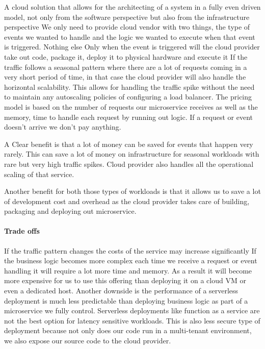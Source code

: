 \documentclass[a4paper, 11pt]{book}
\begin{document}
    A cloud solution that allows for the architecting of a system in a fully even driven model, not only from the software perspective but also from the infrastructure perspective
    We only need to provide cloud vendor with two things, the type of events we wanted to handle and the logic we wanted to execute when that event is triggered.
    Nothing else
    Only when the event is triggered will the cloud provider take out code, package it, deploy it to physical hardware and execute it
    If the traffic follows a seasonal pattern where there are a lot of requests coming in a very short period of time, in that case the cloud provider will also handle the horizontal scalability.
    This allows for handling the traffic spike without the need to maintain any autoscaling policies of configuring a load balancer.
    The pricing model is based on the number of requests our microservice receives as well as the memory, time to handle each request by running out logic.
    If a request or event doesn't arrive we don't pay anything.

    A Clear benefit is that a lot of money can be saved for events that happen very rarely.
    This can save a lot of money on infrastructure for seasonal workloads with rare but very high traffic spikes.
    Cloud provider also handles all the operational scaling of that service.

    Another benefit for both those types of workloads is that it allows us to save a lot of development cost and overhead as the cloud provider takes care of building, packaging and deploying out microservice.

    \paragraph{Trade offs}
    If the traffic pattern changes the costs of the service may increase significantly
    If the business logic becomes more complex each time we receive a request or event handling it will require a lot more time and memory.
    As a result it will become more expensive for us to use this offering than deploying it on a cloud VM or even a dedicated host.
    Another downside is the performance of a serverless deployment is much less predictable than deploying business logic as part of a microservice we fully control.
    Serverless deployments like function as a service are not the best option for latency sensitive workloads.
    This is also less secure type of deployment because not only does our code run in a multi-tenant environment, we also expose our source code to the cloud provider.
\end{document}
